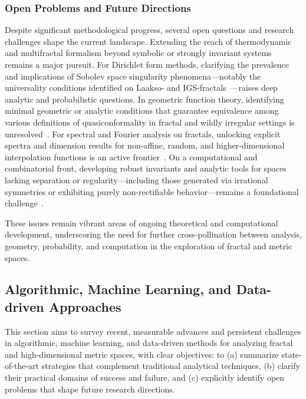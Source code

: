 \documentclass[sigconf]{acmart}
\begin{document}
\subsubsection*{Open Problems and Future Directions}

Despite significant methodological progress, several open questions and research challenges shape the current landscape. Extending the reach of thermodynamic and multifractal formalism beyond symbolic or strongly invariant systems remains a major pursuit. For Dirichlet form methods, clarifying the prevalence and implications of Sobolev space singularity phenomena---notably the universality conditions identified on Laakso- and IGS-fractals~\cite{ref13}---raises deep analytic and probabilistic questions. In geometric function theory, identifying minimal geometric or analytic conditions that guarantee equivalence among various definitions of quasiconformality in fractal and wildly irregular settings is unresolved~\cite{ref47}. For spectral and Fourier analysis on fractals, unlocking explicit spectra and dimension results for non-affine, random, and higher-dimensional interpolation functions is an active frontier~\cite{ref28,ref32,ref33,ref34}. On a computational and combinatorial front, developing robust invariants and analytic tools for spaces lacking separation or regularity---including those generated via irrational symmetries or exhibiting purely non-rectifiable behavior---remains a foundational challenge~\cite{ref20,ref43}.

These issues remain vibrant areas of ongoing theoretical and computational development, underscoring the need for further cross-pollination between analysis, geometry, probability, and computation in the exploration of fractal and metric spaces.

\subsection{Algorithmic, Machine Learning, and Data-driven Approaches}

This section aims to survey recent, measurable advances and persistent challenges in algorithmic, machine learning, and data-driven methods for analyzing fractal and high-dimensional metric spaces, with clear objectives: to (a) summarize state-of-the-art strategies that complement traditional analytical techniques, (b) clarify their practical domains of success and failure, and (c) explicitly identify open problems that shape future research directions.
\end{document}
